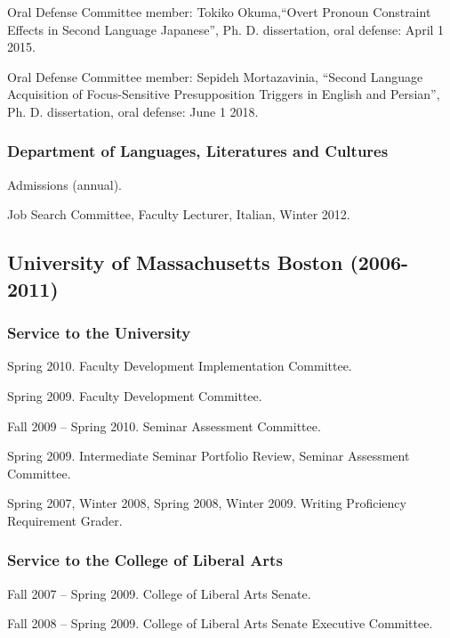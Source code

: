 \documentclass[11pt]{article}
\begin{document}
Oral Defense Committee member:  Tokiko Okuma,``Overt Pronoun Constraint Effects in Second Language Japanese'', Ph. D. dissertation, oral defense: April 1 2015.

Oral Defense Committee member: Sepideh Mortazavinia, ``Second Language Acquisition of Focus-Sensitive Presupposition Triggers in English and Persian'',  Ph. D. dissertation, oral defense: June 1 2018.


\vspace{-10pt}

\subsubsection*{Department of Languages, Literatures and Cultures}

 Admissions (annual).

Job Search Committee, Faculty Lecturer, Italian, Winter 2012.


\subsection*{University of Massachusetts Boston (2006-2011)}

\subsubsection*{Service to the University}

Spring 2010. Faculty Development Implementation Committee.

Spring 2009. Faculty Development Committee.

Fall 2009 -- Spring 2010. Seminar Assessment Committee.

Spring 2009. Intermediate Seminar Portfolio Review, Seminar Assessment Committee.

Spring 2007, Winter 2008, Spring 2008, Winter 2009. Writing Proficiency Requirement Grader.


\subsubsection*{Service to the College of Liberal Arts}

Fall 2007 -- Spring 2009. College of Liberal Arts Senate.

Fall 2008 -- Spring 2009. College of Liberal Arts Senate Executive Committee.
\end{document}
